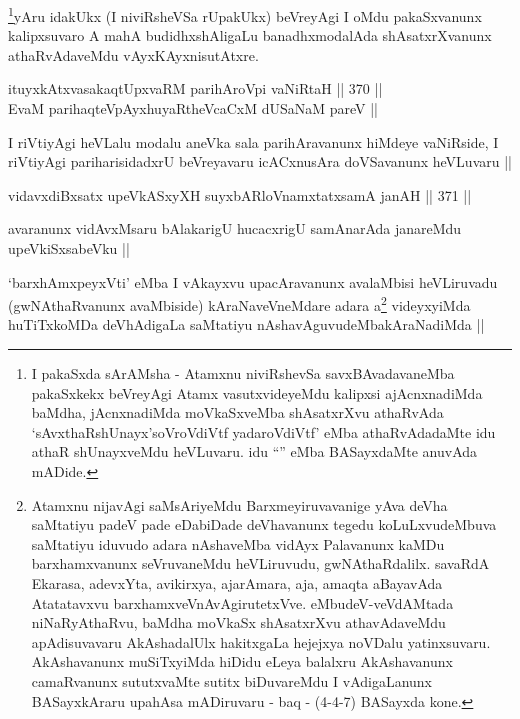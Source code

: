\begin{artha}
\footnote{I pakaSxda sArAMsha - Atamxnu niviRshevSa savxBAvadavaneMba
  pakaSxkekx beVreyAgi Atamx vasutxvideyeMdu kalipxsi ajAcnxnadiMda
  baMdha, jAcnxnadiMda moVkaSxveMba shAsatxrXvu athaRvAda
  `sAvxthaRshUnayx'soV\s roVdiVtf yadaroVdiVtf' eMba athaRvAdadaMte
  idu athaR shUnayxveMdu heVLuvaru. idu ``\stext'' eMba BASayxdaMte
  anuvAda mADide.}yAru idakUkx (I niviRsheVSa rUpakUkx) beVreyAgi I oMdu
pakaSxvanunx kalipxsuvaro A mahA budidhxshAligaLu banadhxmodalAda
shAsatxrXvanunx athaRvAdaveMdu vAyxKAyxnisutAtxre.
\end{artha}

\begin{shl}
ituyxkAtxvasakaqtUpxvaRM parihAroV\s pi vaNiRtaH ||  370 ||  \\
EvaM parihaqteV\s pAyxhuyaRtheVcaCxM dUSaNaM pareV ||
\end{shl}

\begin{artha}
I riVtiyAgi heVLalu modalu aneVka sala parihAravanunx hiMdeye
vaNiRside, I riVtiyAgi pariharisidadxrU beVreyavaru icACxnusAra
doVSavanunx heVLuvaru ||
\end{artha}

\begin{shl}
vidavxdiBxsatx upeVkASxyXH suyxbARloVnamxtatxsamA janAH ||  371 ||  
\end{shl}

\begin{artha}
avaranunx vidAvxMsaru bAlakarigU hucacxrigU samAnarAda janareMdu
upeVkiSxsabeVku ||
\end{artha}


\begin{artha}
`barxhAmxpeyxVti' eMba I vAkayxvu upacAravanunx avalaMbisi heVLiruvadu
  (gwNAthaRvanunx avaMbiside) kAraNaveVneMdare adara
  a\footnote{Atamxnu nijavAgi saMsAriyeMdu Barxmeyiruvavanige yAva
    deVha saMtatiyu padeV pade eDabiDade deVhavanunx tegedu
    koLuLxvudeMbuva saMtatiyu iduvudo adara nAshaveMba vidAyx
    Palavanunx kaMDu barxhamxvanunx seVruvaneMdu heVLiruvudu,
    gwNAthaRdalilx. savaRdA Ekarasa, adevxYta, avikirxya, ajarAmara,
    aja, amaqta aBayavAda Atatatavxvu
    barxhamxveVnAvAgirutetxVve. eMbudeV-veVdAMtada niNaRyAthaRvu,
    baMdha moVkaSx shAsatxrXvu athavAdaveMdu apAdisuvavaru
    AkAshadalUlx hakitxgaLa hejejxya noVDalu
    yatinxsuvaru. AkAshavanunx muSiTxyiMda hiDidu eLeya balalxru
    AkAshavanunx camaRvanunx sututxvaMte sutitx biDuvareMdu I
    vAdigaLanunx BASayxkAraru upahAsa mADiruvaru - baq - (4-4-7)
    BASayxda kone.} videyxyiMda huTiTxkoMDa deVhAdigaLa saMtatiyu
  nAshavAguvudeMbakAraNadiMda ||
\end{artha}
